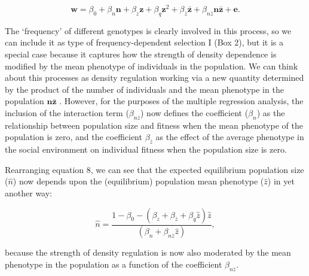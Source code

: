 \documentclass{article}
\begin{document}
\begin{equation} \label{eq: PDDR}
\bm{w}=\beta_{0} +\beta_{n} \bm{n} + \beta_{z} \bm{z} + \beta_{q} \bm{z}^2 + \beta_{\bar{z}} \bar{\bm{z}} + \beta_{n\bar{z}} \bm{n} \bar{\bm{z}}  +  \bm{e}.
\end{equation}

The `frequency' of different genotypes is clearly involved in this process, so we can include it as type of frequency-dependent selection I (Box 2), but it is a special case because it captures how the strength of density dependence is modified by the mean phenotype of individuals in the population. We can think about this processes as density regulation working via a new quantity determined by the product of the number of individuals and the mean phenotype in the population $\bm{n}\bar{\bm{z}}$ \citep{Engen2020}. However, for the purposes of the multiple regression analysis, the inclusion of the interaction term ($\beta_{n\bar{z}}$) now defines the coefficient ($\beta_{n}$) as the relationship between population size and fitness when the mean phenotype of the population is zero, and the coefficient $ \beta_{\bar{z}}$ as the effect of the average phenotype in the social environment on individual fitness when the population size is zero. 

Rearranging equation 8, we can see that the expected equilibrium population size ($\hat{n}$) now depends upon the (equilibrium) population mean phenotype ($\hat{z}$) in yet another way:

\begin{equation}
\hat{n} = \frac{1-\beta_{0}-(\beta_{z}  + \beta_{\bar{z}} + \beta_{q}\hat{z})\hat{z}}{(\beta_{n} +  \beta_{n\bar{z}} \hat{z})},
\end{equation}

\noindent because the strength of density regulation is now also moderated by the mean phenotype in the population as a function of the coefficient  $\beta_{n\bar{z}}$. 
\end{document}
